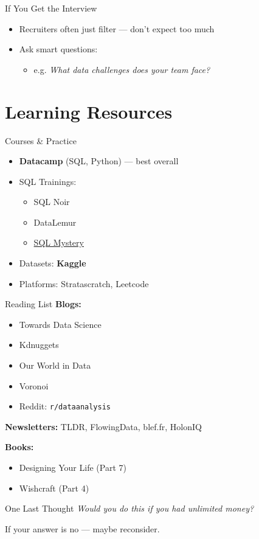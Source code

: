\documentclass[10pt,a4paper]{article}
\begin{document}
\begin{multicols}{3}
\begin{textbox}{If You Get the Interview}
\begin{itemize}
    \item Recruiters often just filter — don't expect too much
    \item Ask smart questions:
    \begin{itemize}
        \item e.g. \emph{What data challenges does your team face?}
    \end{itemize}
\end{itemize}
\end{textbox}

\section{Learning Resources}

\begin{textbox}{Courses & Practice}
\begin{itemize}
    \item \textbf{Datacamp} (SQL, Python) — best overall
    \item SQL Trainings:
    \begin{itemize}
        \item SQL Noir
        \item DataLemur
        \item \href{https://mystery.knightlab.com/}{SQL Mystery}
    \end{itemize}
    \item Datasets: \textbf{Kaggle}
    \item Platforms: Stratascratch, Leetcode
\end{itemize}
\end{textbox}

\begin{textbox}{Reading List}
\textbf{Blogs:}
\begin{itemize}
    \item Towards Data Science
    \item Kdnuggets
    \item Our World in Data
    \item Voronoi
    \item Reddit: \texttt{r/dataanalysis}
\end{itemize}
\textbf{Newsletters:} TLDR, FlowingData, blef.fr, HolonIQ

\textbf{Books:}
\begin{itemize}
    \item Designing Your Life (Part 7)
    \item Wishcraft (Part 4)
\end{itemize}
\end{textbox}

\begin{textbox}{One Last Thought}
\emph{Would you do this if you had unlimited money?}

If your answer is no — maybe reconsider.
\end{textbox}

\end{multicols}
\end{document}
